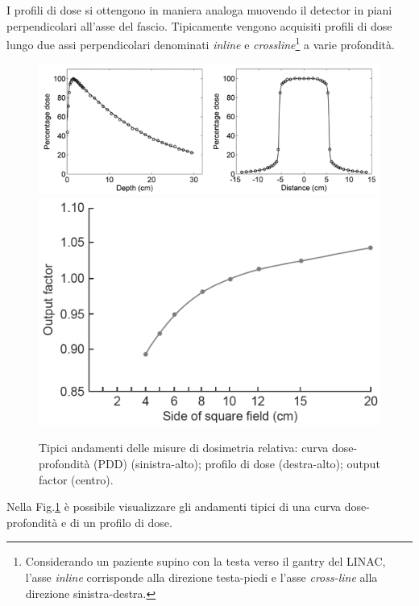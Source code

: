 I profili di dose si ottengono in maniera analoga muovendo il detector in piani perpendicolari all'asse del fascio. Tipicamente vengono acquisiti profili di dose lungo due assi perpendicolari denominati \textit{inline} e \textit{crossline}\footnote{Considerando un paziente supino con la testa verso il gantry del LINAC, l'asse \textit{inline} corrisponde alla direzione testa-piedi e l'asse \textit{cross-line} alla direzione sinistra-destra.} a varie profondità.\\
\begin{figure}[!t]
\centering
\includegraphics[width=\textwidth]{./cap2/pdd_prof.png}\\
\includegraphics[width=.5\textwidth]{./cap2/of.png}
\caption{Tipici andamenti delle misure di dosimetria relativa: curva dose-profondità (PDD) (sinistra-alto); profilo di dose (destra-alto); output factor (centro).}
\label{fig:pdd_prof}
\end{figure}
Nella Fig.\ref{fig:pdd_prof} è possibile visualizzare gli andamenti tipici di una curva dose-profondità e di un profilo di dose.

